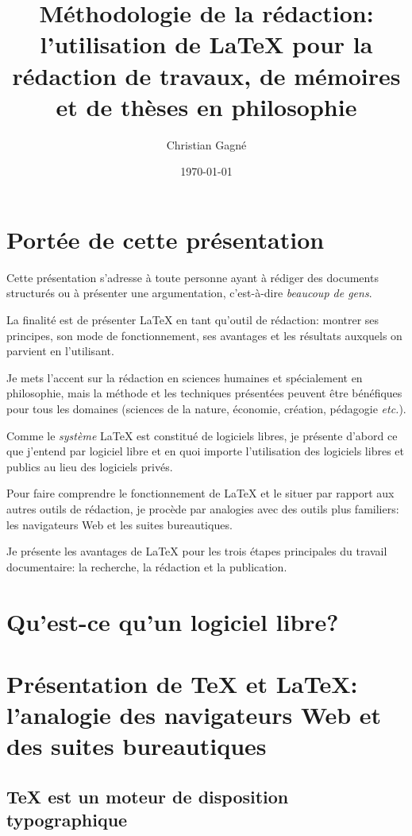 \documentclass{article}
\title{Méthodologie de la rédaction: l’utilisation de \LaTeX{} pour la rédaction de travaux, de mémoires et de thèses en philosophie}
\author{Christian Gagné}
\date{\today}
\begin{document}
\maketitle

\tableofcontents

\section{Portée de cette présentation}

Cette présentation s’adresse à toute personne ayant à rédiger des documents structurés ou à présenter une argumentation, c’est-à-dire \emph{beaucoup de gens}.

La finalité est de présenter \LaTeX{} en tant qu’outil de rédaction: montrer ses principes, son mode de fonctionnement, ses avantages et les résultats auxquels on parvient en l’utilisant.

Je mets l’accent sur la rédaction en sciences humaines et spécialement en philosophie, mais la méthode et les techniques présentées peuvent être bénéfiques pour tous les domaines (sciences de la nature, économie, création, pédagogie \emph{etc.}).

Comme le \emph{système} \LaTeX{} est constitué de logiciels libres, je présente d’abord ce que j’entend par logiciel libre et en quoi importe l’utilisation des logiciels libres et publics au lieu des logiciels privés.

Pour faire comprendre le fonctionnement de \LaTeX{} et le situer par rapport aux autres outils de rédaction, je procède par analogies avec des outils plus familiers: les navigateurs Web et les suites bureautiques.

Je présente les avantages de \LaTeX{} pour les trois étapes principales du travail documentaire: la recherche, la rédaction et la publication.

\section{Qu’est-ce qu’un logiciel libre?}

\section{Présentation de \TeX{} et \LaTeX{}: l’analogie des navigateurs Web et des suites bureautiques}

\subsection{\TeX{} est un moteur de disposition typographique}
\end{document}
